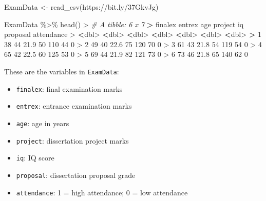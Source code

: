 \documentclass[
]{book}
\newenvironment{Shaded}{\begin{snugshade}}{\end{snugshade}}
\newcommand{\CommentTok}[1]{\textcolor[rgb]{0.56,0.35,0.01}{\textit{#1}}}
\newcommand{\DecValTok}[1]{\textcolor[rgb]{0.00,0.00,0.81}{#1}}
\newcommand{\ErrorTok}[1]{\textcolor[rgb]{0.64,0.00,0.00}{\textbf{#1}}}
\newcommand{\FloatTok}[1]{\textcolor[rgb]{0.00,0.00,0.81}{#1}}
\newcommand{\FunctionTok}[1]{\textcolor[rgb]{0.00,0.00,0.00}{#1}}
\newcommand{\NormalTok}[1]{#1}
\newcommand{\OtherTok}[1]{\textcolor[rgb]{0.56,0.35,0.01}{#1}}
\newcommand{\SpecialCharTok}[1]{\textcolor[rgb]{0.00,0.00,0.00}{#1}}
\newcommand{\StringTok}[1]{\textcolor[rgb]{0.31,0.60,0.02}{#1}}
\providecommand{\tightlist}{%
  \setlength{\itemsep}{0pt}\setlength{\parskip}{0pt}}
\theoremstyle{definition}
\theoremstyle{definition}
\theoremstyle{definition}
\theoremstyle{definition}
\theoremstyle{remark}
\begin{document}
\begin{Shaded}
\begin{Highlighting}[]
\NormalTok{ExamData }\OtherTok{\textless{}{-}} \FunctionTok{read\_csv}\NormalTok{(}\StringTok{\textquotesingle{}https://bit.ly/37GkvJg\textquotesingle{}}\NormalTok{)}

\NormalTok{ExamData }\SpecialCharTok{\%\textgreater{}\%} \FunctionTok{head}\NormalTok{()}
\SpecialCharTok{\textgreater{}} \CommentTok{\# A tibble: 6 x 7}
\ErrorTok{\textgreater{}}\NormalTok{   finalex entrex   age project    iq proposal attendance}
\SpecialCharTok{\textgreater{}}     \ErrorTok{\textless{}}\NormalTok{dbl}\SpecialCharTok{\textgreater{}}  \ErrorTok{\textless{}}\NormalTok{dbl}\SpecialCharTok{\textgreater{}} \ErrorTok{\textless{}}\NormalTok{dbl}\SpecialCharTok{\textgreater{}}   \ErrorTok{\textless{}}\NormalTok{dbl}\SpecialCharTok{\textgreater{}} \ErrorTok{\textless{}}\NormalTok{dbl}\SpecialCharTok{\textgreater{}}    \ErrorTok{\textless{}}\NormalTok{dbl}\SpecialCharTok{\textgreater{}}      \ErrorTok{\textless{}}\NormalTok{dbl}\SpecialCharTok{\textgreater{}}
\ErrorTok{\textgreater{}} \DecValTok{1}      \DecValTok{38}     \DecValTok{44}  \FloatTok{21.9}      \DecValTok{50}   \DecValTok{110}       \DecValTok{44}          \DecValTok{0}
\SpecialCharTok{\textgreater{}} \DecValTok{2}      \DecValTok{49}     \DecValTok{40}  \FloatTok{22.6}      \DecValTok{75}   \DecValTok{120}       \DecValTok{70}          \DecValTok{0}
\SpecialCharTok{\textgreater{}} \DecValTok{3}      \DecValTok{61}     \DecValTok{43}  \FloatTok{21.8}      \DecValTok{54}   \DecValTok{119}       \DecValTok{54}          \DecValTok{0}
\SpecialCharTok{\textgreater{}} \DecValTok{4}      \DecValTok{65}     \DecValTok{42}  \FloatTok{22.5}      \DecValTok{60}   \DecValTok{125}       \DecValTok{53}          \DecValTok{0}
\SpecialCharTok{\textgreater{}} \DecValTok{5}      \DecValTok{69}     \DecValTok{44}  \FloatTok{21.9}      \DecValTok{82}   \DecValTok{121}       \DecValTok{73}          \DecValTok{0}
\SpecialCharTok{\textgreater{}} \DecValTok{6}      \DecValTok{73}     \DecValTok{46}  \FloatTok{21.8}      \DecValTok{65}   \DecValTok{140}       \DecValTok{62}          \DecValTok{0}
\end{Highlighting}
\end{Shaded}

These are the variables in \texttt{ExamData}:

\begin{itemize}
\tightlist
\item
  \texttt{finalex}: final examination marks
\item
  \texttt{entrex}: entrance examination marks
\item
  \texttt{age}: age in years
\item
  \texttt{project}: dissertation project marks
\item
  \texttt{iq}: IQ score
\item
  \texttt{proposal}: dissertation proposal grade
\item
  \texttt{attendance}: 1 = high attendance; 0 = low attendance
\end{itemize}
\end{document}
